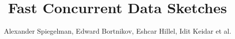 \documentclass[11pt, a4paper]{article}
\begin{document}
\title{Fast Concurrent Data Sketches} 

\author{Alexander Spiegelman, 
Edward Bortnikov,  
Eshcar Hillel, 
Idit Keidar 
et al.}
 
   

\date{}


\maketitle







%

            




%





\end{document}
